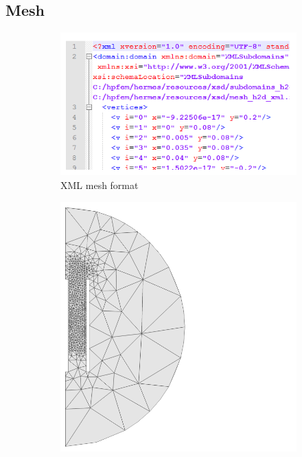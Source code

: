 \documentclass{beamer}
\begin{document}
\subsection{Mesh}
\begin{frame}
	\begin{figure}[H]
		\centering

		\begin{subfigure}{0.4\textwidth}
			\vspace{-20mm}
			\includegraphics[width=.95\textwidth]{codeimg/meshFile.png}
			\caption{XML mesh format}
		\end{subfigure}
		\begin{subfigure}{0.55\textwidth}
			\hspace{20mm}
			\includegraphics[width=.95\textwidth]{screenshots/mesh.png}

\end{subfigure}
\end{figure}
\end{frame}
\end{document}
